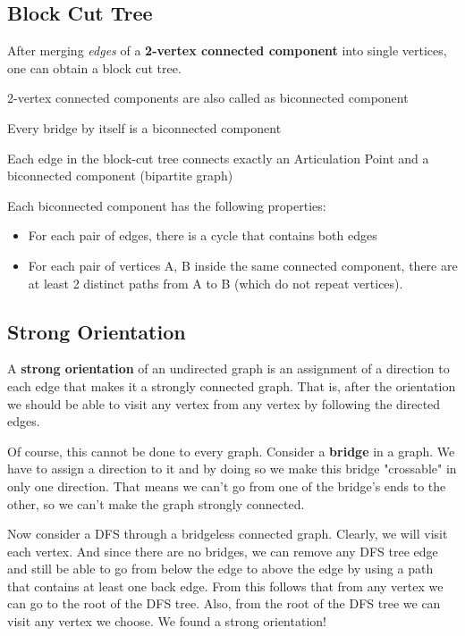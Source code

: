	\subsection{Block Cut Tree}

	After merging \textit{edges} of a \textbf{2-vertex connected component} into single vertices, one can obtain a block cut tree.

	2-vertex connected components are also called as biconnected component
	
	Every bridge by itself is a biconnected component

	Each edge in the block-cut tree connects exactly an Articulation Point and a biconnected component (bipartite graph)

	Each biconnected component has the following properties:

	\begin{itemize}
		\item For each pair of edges, there is a cycle that contains both edges
		\item For each pair of vertices {A, B} inside the same connected component, there are at least 2 distinct paths from A to B (which do not repeat vertices).
	\end{itemize}

	

	\subsection{Strong Orientation}

	A \textbf{strong orientation} of an undirected graph is an assignment of a direction to each edge that makes it a strongly connected graph.
	That is, after the orientation we should be able to visit any vertex from any vertex by following the directed edges.

	Of course, this cannot be done to every graph. Consider a \textbf{bridge} in a graph.
	We have to assign a direction to it and by doing so we make this bridge "crossable" in only one direction.
	That means we can't go from one of the bridge's ends to the other, so we can't make the graph strongly connected.

	Now consider a DFS through a bridgeless connected graph. Clearly, we will visit each vertex.
	And since there are no bridges, we can remove any DFS tree edge and still be able to go from below the edge to
	above the edge by using a path that contains at least one back edge. 
	From this follows that from any vertex we can go to the root of the DFS tree. 
	Also, from the root of the DFS tree we can visit any vertex we choose. We found a strong orientation!

